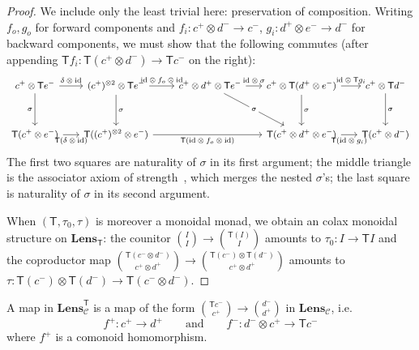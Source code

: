 \documentclass[11pt, oneside, article]{memoir}
\theoremstyle{definition}
\theoremstyle{plain}
\newcommand{\cat}[1]{\mathcal{#1}}%
\newcommand{\Cat}[1]{\mathbf{#1}}%
\newcommand{\Fun}[1]{\mathsf{#1}}%
\newcommand{\id}{\mathrm{id}}
\newcommand{\qqand}{\qquad\text{and}\qquad}
\newcommand{\Lens}[1]{\Cat{Lens}_{#1}}
\newcommand{\inpt}[1]{#1^{-}}
\newcommand{\outp}[1]{#1^{+}}
\newcommand{\lensob}[1]{\binom{\inpt{#1}}{\outp{#1}}}%
\begin{document}
\begin{proof}
We include only the least trivial here: preservation of composition. Writing $f_o,g_o$ for forward components and $f_i\colon\outp c\otimes\inpt d\to\inpt c$, $g_i\colon\outp d\otimes\inpt e\to\inpt d$ for backward components, we must show that the following commutes (after appending $\Fun{T}f_i\colon\Fun{T}(\outp c\otimes\inpt d)\to\Fun{T}\inpt c$ on the right):
\[
\begin{tikzcd}[column sep=1.6em, row sep=3em, every label/.append style={font=\scriptsize}, font=\small, ampersand replacement=\&]
\outp c\otimes\Fun{T}\inpt e
  \ar[r, "\delta\otimes\id"]
  \ar[d, "\sigma"']
\& (\outp c)^{\otimes 2}\otimes\Fun{T}\inpt e
  \ar[r, "\id\otimes f_o\otimes\id"]
  \ar[d, "\sigma"]
\&[5pt] \outp c\otimes\outp d\otimes\Fun{T}\inpt e
  \ar[r, "\id\otimes\sigma"]
  \ar[dr, "\sigma" description]
\& \outp c\otimes\Fun{T}(\outp d\otimes\inpt e)
  \ar[r, "\id\otimes\Fun{T}g_i"]
  \ar[d, "\sigma"]
\& \outp c\otimes\Fun{T}\inpt d
  \ar[d, "\sigma"]
\\
\Fun{T}(\outp c\otimes\inpt e)
  \ar[r, "\Fun{T}(\delta\otimes\id)"']
\& \Fun{T}((\outp c)^{\otimes 2}\otimes\inpt e)
  \ar[rr, "\Fun{T}(\id\otimes f_o\otimes\id)"']
\&
\& \Fun{T}(\outp c\otimes\outp d\otimes\inpt e)
  \ar[r, "\Fun{T}(\id\otimes g_i)"']
\& \Fun{T}(\outp c\otimes\inpt d)
\end{tikzcd}
\]
The first two squares are naturality of $\sigma$ in its first argument; the middle triangle is the associator axiom of strength~\cite[(1.6)]{kock1972strong}, which merges the nested $\sigma$'s; the last square is naturality of $\sigma$ in its second argument.

When $(\Fun T,\tau_0,\tau)$ is moreover a monoidal monad, we obtain an colax monoidal structure on $\Lens{\Fun{T}}$: the counitor $\binom{I}{I}\to\binom{\Fun T(I)}{I}$ amounts to $\tau_0\colon I\to\Fun T I$ and the coproductor map $\binom{\Fun{T}(\inpt c\otimes\inpt d)}{\outp c\otimes\outp d}\to\binom{\Fun{T}(\inpt c)\otimes\Fun T(\inpt d)}{\outp c\otimes\outp d}$ amounts to $\tau\colon \Fun{T}(\inpt c)\otimes\Fun T(\inpt d)\to \Fun{T}(\inpt c\otimes\inpt d)$.
\end{proof}

A map in $\Lens{\cat{C}}^{\Fun{T}}$ is a map of the form $\binom{\Fun{T}\inpt c}{\outp c}\to\lensob{d}$ in $\Lens{\cat{C}}$, i.e.
\[
\outp f\colon \outp c\to\outp d
\qqand
\inpt f\colon \inpt d\otimes\outp c\to\Fun{T}\inpt c
\]
where $\outp f$ is a comonoid homomorphism.
\end{document}
